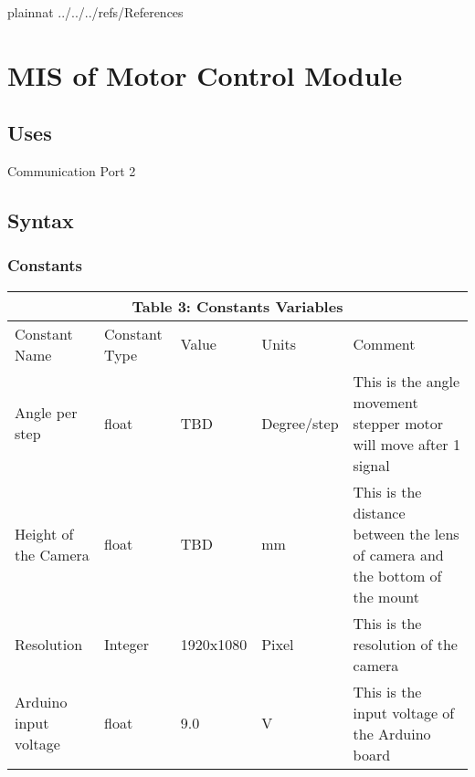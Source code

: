 \documentclass[12pt, titlepage]{article}
\begin{document}
 

\newpage

 {plainnat}
 {../../../refs/References}

\newpage

\section{MIS of Motor Control Module} 



\subsection{Uses}
Communication Port 2

\subsection{Syntax}

\subsubsection{Constants}
\begin{tabular}{|p{}|p{}|p{}|p{}|p{}|}

\hline \multicolumn{5}{|c|}{Table 3: Constants Variables}\\

\hline Constant Name&Constant Type&Value&Units &Comment\\

\hline Angle per step&float&TBD&Degree/step&This is the angle movement stepper motor will move after 1 signal \\

\hline Height of the Camera&float&TBD&mm&This is the distance between the lens of camera and the bottom of the mount\\

\hline Resolution&Integer&1920x1080&Pixel&This is the resolution of the camera\\
\hline Arduino input voltage&float&9.0&V&This is the input voltage of the Arduino board\\


\hline

\end{tabular}
\end{document}
